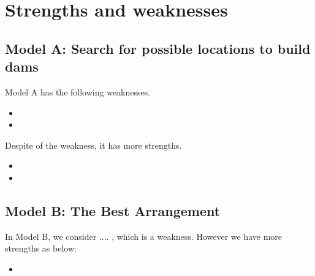 \documentclass{mcmthesis}
\begin{document}





\section{Strengths and weaknesses}
\subsection{Model A: Search for possible locations to build dams}
Model A has the following weaknesses.
\begin{itemize}
\item 
\item 
\end{itemize}
Despite of the weakness, it has more strengths.
\begin{itemize}
  \item 
  \item 
\end{itemize}

\subsection{Model B: The Best Arrangement}
In Model B, we consider .... , which is a weakness. However we have more strengths as below:
\begin{itemize}
  \item 
\end{itemize}
\end{document}

